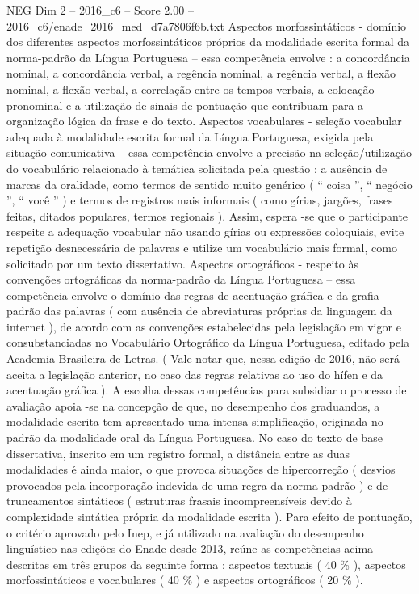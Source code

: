 \begin{textsample}{NEG Dim 2 – 2016\_c6 – Score 2.00 – 2016\_c6/enade\_2016\_med\_d7a7806f6b.txt}
Aspectos morfossintáticos - domínio dos diferentes aspectos morfossintáticos próprios da modalidade escrita formal da norma-padrão da Língua Portuguesa – essa competência envolve : a concordância nominal, a concordância verbal, a regência nominal, a regência verbal, a flexão nominal, a flexão verbal, a correlação entre os tempos verbais, a colocação pronominal e a utilização de sinais de pontuação que contribuam para a organização lógica da frase e do texto.
Aspectos vocabulares - seleção vocabular adequada à modalidade escrita formal da Língua Portuguesa, exigida pela situação comunicativa – essa competência envolve a precisão na seleção/utilização do vocabulário relacionado à temática solicitada pela questão ; a ausência de marcas da oralidade, como termos de sentido muito genérico ( “ coisa ”, “ negócio ”, “ você ” ) e termos de registros mais informais ( como gírias, jargões, frases feitas, ditados populares, termos regionais ).
Assim, espera -se que o participante respeite a adequação vocabular não usando gírias ou expressões coloquiais, evite repetição desnecessária de palavras e utilize um vocabulário mais formal, como solicitado por um texto dissertativo.
Aspectos ortográficos - respeito às convenções ortográficas da norma-padrão da Língua Portuguesa – essa competência envolve o domínio das regras de acentuação gráfica e da grafia padrão das palavras ( com ausência de abreviaturas próprias da linguagem da internet ), de acordo com as convenções estabelecidas pela legislação em vigor e consubstanciadas no Vocabulário Ortográfico da Língua Portuguesa, editado pela Academia Brasileira de Letras. ( Vale notar que, nessa edição de 2016, não será aceita a legislação anterior, no caso das regras relativas ao uso do hífen e da acentuação gráfica ).
A escolha dessas competências para subsidiar o processo de avaliação apoia -se na concepção de que, no desempenho dos graduandos, a modalidade escrita tem apresentado uma intensa simplificação, originada no padrão da modalidade oral da Língua Portuguesa.
No caso do texto de base dissertativa, inscrito em um registro formal, a distância entre as duas modalidades é ainda maior, o que provoca situações de hipercorreção ( desvios provocados pela incorporação indevida de uma regra da norma-padrão ) e de truncamentos sintáticos ( estruturas frasais incompreensíveis devido à complexidade sintática própria da modalidade escrita ).
Para efeito de pontuação, o critério aprovado pelo Inep, e já utilizado na avaliação do desempenho linguístico nas edições do Enade desde 2013, reúne as competências acima descritas em três grupos da seguinte forma : aspectos textuais ( 40 \% ), aspectos morfossintáticos e vocabulares ( 40 \% ) e aspectos ortográficos ( 20 \% ).

\end{textsample}
